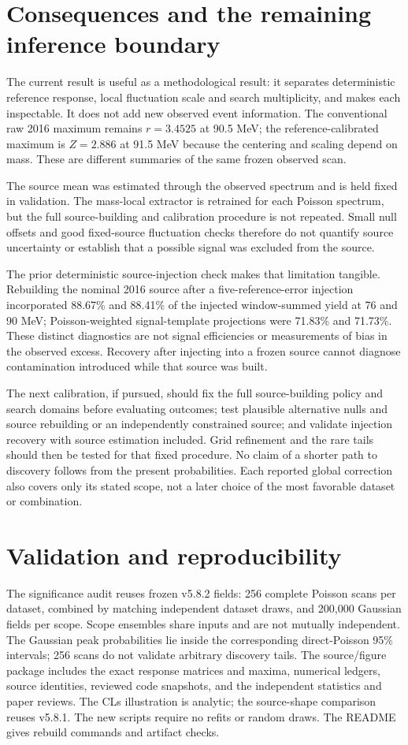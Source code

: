 \documentclass[11pt]{article}
\newcommand{\heading}[1]{\section*{\color{navy}#1}}
\begin{document}
\clearpage
\heading{Consequences and the remaining inference boundary}
The current result is useful as a methodological result: it separates deterministic reference response, local fluctuation scale and search multiplicity, and makes each inspectable. It does not add new observed event information. The conventional raw 2016 maximum remains $r=3.4525$ at 90.5 MeV; the reference-calibrated maximum is $Z=2.886$ at 91.5 MeV because the centering and scaling depend on mass. These are different summaries of the same frozen observed scan.

The source mean was estimated through the observed spectrum and is held fixed in validation. The mass-local extractor is retrained for each Poisson spectrum, but the full source-building and calibration procedure is not repeated. Small null offsets and good fixed-source fluctuation checks therefore do not quantify source uncertainty or establish that a possible signal was excluded from the source.

The prior deterministic source-injection check makes that limitation tangible. Rebuilding the nominal 2016 source after a five-reference-error injection incorporated 88.67\% and 88.41\% of the injected window-summed yield at 76 and 90 MeV; Poisson-weighted signal-template projections were 71.83\% and 71.73\%. These distinct diagnostics are not signal efficiencies or measurements of bias in the observed excess. Recovery after injecting into a frozen source cannot diagnose contamination introduced while that source was built.

The next calibration, if pursued, should fix the full source-building policy and search domains before evaluating outcomes; test plausible alternative nulls and source rebuilding or an independently constrained source; and validate injection recovery with source estimation included. Grid refinement and the rare tails should then be tested for that fixed procedure. No claim of a shorter path to discovery follows from the present probabilities. Each reported global correction also covers only its stated scope, not a later choice of the most favorable dataset or combination.

\heading{Validation and reproducibility}
The significance audit reuses frozen v5.8.2 fields: 256 complete Poisson scans per dataset, combined by matching independent dataset draws, and 200,000 Gaussian fields per scope. Scope ensembles share inputs and are not mutually independent. The Gaussian peak probabilities lie inside the corresponding direct-Poisson 95\% intervals; 256 scans do not validate arbitrary discovery tails. The source/figure package includes the exact response matrices and maxima, numerical ledgers, source identities, reviewed code snapshots, and the independent statistics and paper reviews. The CLs illustration is analytic; the source-shape comparison reuses v5.8.1. The new scripts require no refits or random draws. The README gives rebuild commands and artifact checks.
\end{document}
